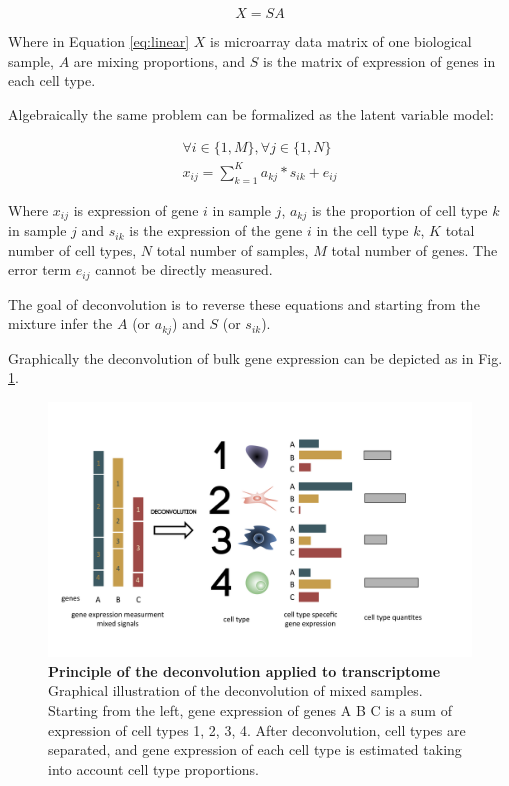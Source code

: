 \documentclass[12pt,]{book}
\theoremstyle{definition}
\theoremstyle{definition}
\theoremstyle{definition}
\theoremstyle{remark}
\begin{document}
\begin{equation}
X = SA  \label{eq:linear}
\end{equation}

Where in Equation \eqref{eq:linear} \(X\) is microarray data matrix of one
biological sample, \(A\) are mixing proportions, and \(S\) is the matrix
of expression of genes in each cell type.

Algebraically the same problem can be formalized as the latent variable
model:

\begin{equation}
\begin{aligned}
\forall i \in \{1,M\},  \forall  j \in \{1,N\} \\
x_{ij}= \sum_{k=1}^K a_{kj} *s_{ik}+ e_{ij} \label{eq:algebraic}
\end{aligned}
\end{equation}

Where \(x_{ij}\) is expression of gene \(i\) in sample \(j\), \(a_{kj}\)
is the proportion of cell type \(k\) in sample \(j\) and \(s_{ik}\) is
the expression of the gene \(i\) in the cell type \(k\), \(K\) total
number of cell types, \(N\) total number of samples, \(M\) total number
of genes. The error term \(e_{ij}\) cannot be directly measured.

The goal of deconvolution is to reverse these equations and starting
from the mixture infer the \(A\) (or \(a_{kj}\)) and \(S\) (or
\(s_{ik}\)).

Graphically the deconvolution of bulk gene expression can be depicted as
in Fig. \ref{fig:deconvolution-cartoon}.

\begin{figure}

{\centering \includegraphics[width=1\linewidth]{figures-ext/deconv} 

}

\caption[Principle of the deconvolution applied to transcriptome]{\textbf{Principle of the
deconvolution applied to transcriptome} Graphical illustration of the
deconvolution of mixed samples. Starting from the left, gene expression
of genes A B C is a sum of expression of cell types 1, 2, 3, 4. After
deconvolution, cell types are separated, and gene expression of each
cell type is estimated taking into account cell type proportions.}\label{fig:deconvolution-cartoon}
\end{figure}
\end{document}
